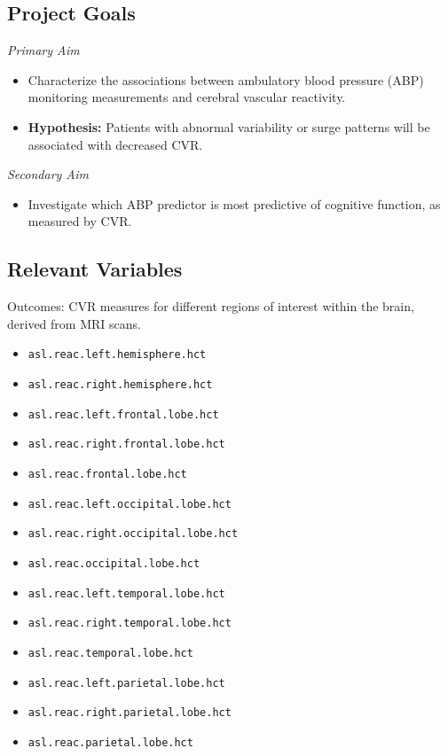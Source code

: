 \documentclass[10pt]{article}\usepackage[]{graphicx}\usepackage[]{color}
\begin{document}
\subsection{Project Goals}

{\it Primary Aim}
\begin{itemize}
  \item Characterize the associations between ambulatory blood pressure (ABP) monitoring measurements and cerebral vascular reactivity.
  \item {\bf Hypothesis:} Patients with abnormal variability or surge patterns will be associated with decreased CVR.
\end{itemize}

{\it Secondary Aim}
\begin{itemize}
\item Investigate which ABP predictor is most predictive of cognitive function, as measured by CVR.
\end{itemize}

\subsection{Relevant Variables}
\label{sec:vars}
Outcomes: CVR measures for different regions of interest within the brain, derived from MRI scans.\\
\begin{itemize}
  \item \texttt{asl.reac.left.hemisphere.hct}
  \item \texttt{asl.reac.right.hemisphere.hct}
  \item \texttt{asl.reac.left.frontal.lobe.hct}
  \item \texttt{asl.reac.right.frontal.lobe.hct}
  \item \texttt{asl.reac.frontal.lobe.hct}
  \item \texttt{asl.reac.left.occipital.lobe.hct}
  \item \texttt{asl.reac.right.occipital.lobe.hct}
  \item \texttt{asl.reac.occipital.lobe.hct}
  \item \texttt{asl.reac.left.temporal.lobe.hct}
  \item \texttt{asl.reac.right.temporal.lobe.hct}
  \item \texttt{asl.reac.temporal.lobe.hct}
  \item \texttt{asl.reac.left.parietal.lobe.hct}
  \item \texttt{asl.reac.right.parietal.lobe.hct}
  \item \texttt{asl.reac.parietal.lobe.hct}
\end{itemize}
\end{document}
